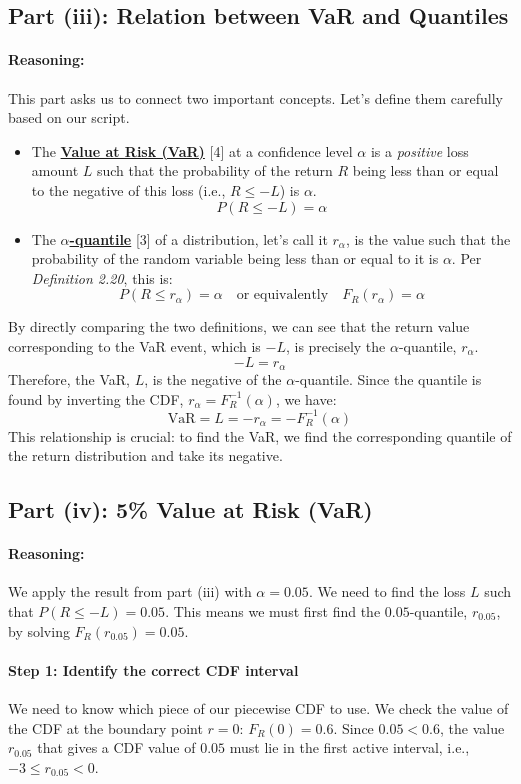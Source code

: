 \documentclass[11pt,a4paper]{article}
\newcommand{\concept}[2]{\hyperlink{note:#1}{#2}}
\begin{document}
\subsection{Part (iii): Relation between VaR and Quantiles}
\paragraph{Reasoning:}
This part asks us to connect two important concepts. Let's define them carefully based on our script.
\begin{itemize}
    \item The \concept{var}{\textbf{Value at Risk (VaR)}} [4] at a confidence level $\alpha$ is a \textit{positive} loss amount $L$ such that the probability of the return $R$ being less than or equal to the negative of this loss (i.e., $R \le -L$) is $\alpha$.
    \[ P(R \le -L) = \alpha \]
    \item The \concept{quantile}{\textbf{$\alpha$-quantile}} [3] of a distribution, let's call it $r_\alpha$, is the value such that the probability of the random variable being less than or equal to it is $\alpha$. Per \textit{Definition 2.20}, this is:
    \[ P(R \le r_\alpha) = \alpha \quad \text{or equivalently} \quad F_R(r_\alpha) = \alpha \]
\end{itemize}
By directly comparing the two definitions, we can see that the return value corresponding to the VaR event, which is $-L$, is precisely the $\alpha$-quantile, $r_\alpha$.
\[ -L = r_\alpha \]
Therefore, the VaR, $L$, is the negative of the $\alpha$-quantile. Since the quantile is found by inverting the CDF, $r_\alpha = F_R^{-1}(\alpha)$, we have:
\[ \text{VaR} = L = -r_\alpha = -F_R^{-1}(\alpha) \]
This relationship is crucial: to find the VaR, we find the corresponding quantile of the return distribution and take its negative.

\subsection{Part (iv): 5\% Value at Risk (VaR)}
\paragraph{Reasoning:}
We apply the result from part (iii) with $\alpha = 0.05$. We need to find the loss $L$ such that $P(R \le -L) = 0.05$. This means we must first find the $0.05$-quantile, $r_{0.05}$, by solving $F_R(r_{0.05}) = 0.05$.

\paragraph{Step 1: Identify the correct CDF interval}
We need to know which piece of our piecewise CDF to use. We check the value of the CDF at the boundary point $r=0$: $F_R(0) = 0.6$.
Since $0.05 < 0.6$, the value $r_{0.05}$ that gives a CDF value of $0.05$ must lie in the first active interval, i.e., $-3 \le r_{0.05} < 0$.
\end{document}

